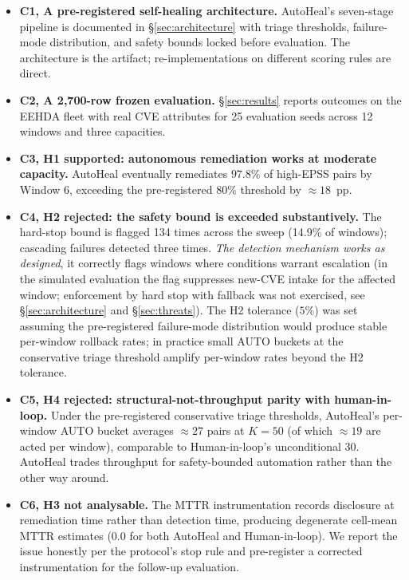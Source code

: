\begin{itemize}
\item \textbf{C1, A pre-registered self-healing architecture.}
AutoHeal's seven-stage pipeline is documented in \S\ref{sec:architecture}
with triage thresholds, failure-mode distribution, and safety bounds
locked before evaluation. The architecture is the artifact;
re-implementations on different scoring rules are direct.

\item \textbf{C2, A 2{,}700-row frozen evaluation.}
\S\ref{sec:results} reports outcomes on the EEHDA fleet with real
CVE attributes for 25 evaluation seeds across 12 windows and three
capacities.

\item \textbf{C3, H1 supported: autonomous remediation works at
moderate capacity.} AutoHeal eventually remediates $97.8\%$ of
high-EPSS pairs by Window 6, exceeding the pre-registered $80\%$
threshold by ${\approx}18$~pp.

\item \textbf{C4, H2 rejected: the safety bound is exceeded
substantively.} The hard-stop bound is flagged 134 times across the
sweep (14.9\% of windows); cascading failures detected three
times. \emph{The detection mechanism works as designed}, it
correctly flags windows where conditions warrant escalation
(in the simulated evaluation the flag suppresses new-CVE intake
for the affected window; enforcement by hard stop with fallback
was not exercised, see \S\ref{sec:architecture} and
\S\ref{sec:threats}). The H2 tolerance ($5\%$) was set assuming the pre-registered
failure-mode distribution would produce stable per-window
rollback rates; in practice small AUTO buckets at the
conservative triage threshold amplify per-window rates beyond the
H2 tolerance.

\item \textbf{C5, H4 rejected: structural-not-throughput parity
with human-in-loop.} Under the pre-registered conservative triage
thresholds, AutoHeal's per-window AUTO bucket averages
$\approx 27$ pairs at $K = 50$ (of which $\approx 19$ are acted
per window), comparable to Human-in-loop's
unconditional 30. AutoHeal trades throughput for safety-bounded
automation rather than the other way around.

\item \textbf{C6, H3 not analysable.} The MTTR instrumentation
records disclosure at remediation time rather than detection
time, producing degenerate cell-mean MTTR estimates ($0.0$ for
both AutoHeal and Human-in-loop). We report the issue honestly
per the protocol's stop rule and pre-register a corrected
instrumentation for the follow-up evaluation.
\end{itemize}

